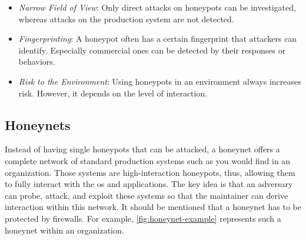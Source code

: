 \begin{itemize}
    \item \textit{Narrow Field of View}: Only direct attacks on honeypots can be investigated, whereas attacks on the production system are not detected.
    \item \textit{Fingerprinting}: A honeypot often has a certain fingerprint that attackers can identify.
          Especially commercial ones can be detected by their responses or behaviors.
    \item \textit{Risk to the Environment}: Using honeypots in an environment always increases risk.
          However, it depends on the level of interaction.
\end{itemize}

\subsection{Honeynets}

Instead of having single honeypots that can be attacked, a honeynet offers a complete network of standard production systems such as you would find in an organization.
Those systems are high-interaction honeypots, thus, allowing them to fully interact with the \ac{os} and applications.
The key idea is that an adversary can probe, attack, and exploit these systems so that the maintainer can derive interaction within this network.
It should be mentioned that a honeynet has to be protected by firewalls.
For example, \autoref{fig:honeynet-example} represents such a honeynet within an organization.


